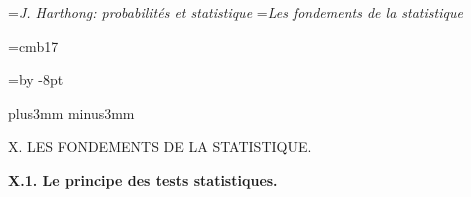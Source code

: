 

\vsize=219.4mm

\auteurcourant={\sl J. Harthong: probabilit\'es et statistique}
\titrecourant={\sl Les fondements de la statistique}

\font\narrowtit=cmb17

\def\hfq{\hfill\quad} 
\def\cc#1{\hfill\quad #1\quad\hfill} 
\def\tv{\vrule height 36pt depth 7pt width0.4pt} 
\def\aub{\hskip1pt} 
\def\sqnab{\hbox{\eightpoint$\raise1.1pt\hbox{$\surd$} 
\overline{n\alpha\beta}$}} 
\newdimen\blocksize \blocksize=\vsize \advance\blocksize by -8pt 


\null\vskip10mm plus3mm minus3mm 

\centerline{\narrowtit X.\hskip5pt LES FONDEMENTS DE LA STATISTIQUE.} 

\vskip10mm 
{\bf X.\aub 1. Le principe des tests statistiques.}
\medskip 
 
